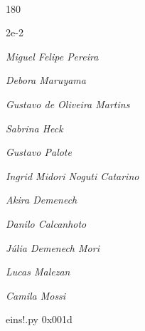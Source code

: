 \documentclass[12pt]{article}
\begin{document}

\pagebreak			

	\ 
	\vfill
	\begin{turn}{180}	
		\begin{minipage}{\textwidth}
		  	\ttfamily %
			\centering
			{\Huge 2e-2}
		  
			\hfill
		  
			

\textit{\small Miguel Felipe Pereira}

\textit{\small Debora Maruyama}

\textit{\small Gustavo de Oliveira Martins}

\textit{\small Sabrina Heck}

\textit{\small Gustavo Palote}

\textit{\small Ingrid Midori Noguti Catarino}

\textit{\small Akira Demenech}

\textit{\small Danilo Calcanhoto}

\textit{\small Júlia Demenech Mori}

\textit{\small Lucas Malezan}

\textit{\small Camila Mossi}

\bigskip

eins!.py
0x001d


		\end{minipage}	
	\end{turn}
	\vfill
	\

\pagebreak
\end{document}
